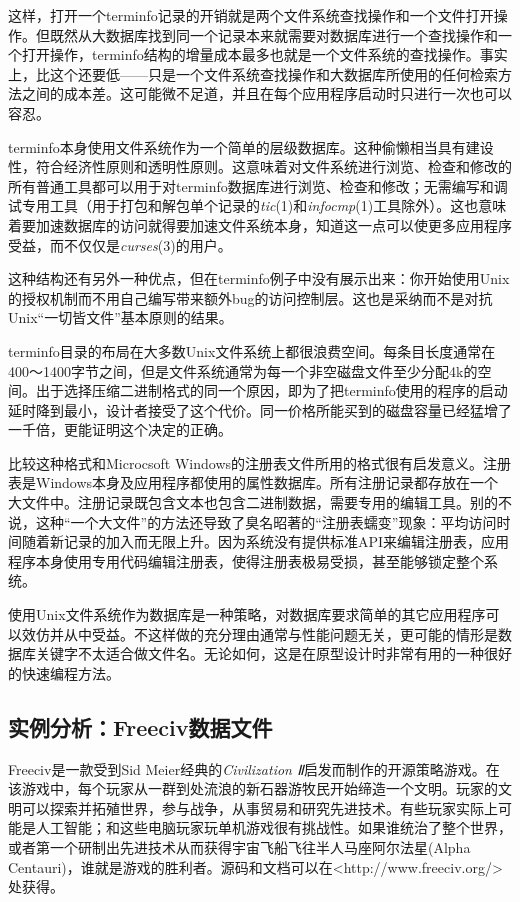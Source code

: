 \documentclass[12pt,oneside]{book}
\begin{document}
\begin{common-format}
这样，打开一个terminfo记录的开销就是两个文件系统查找操作和一个文件打开操作。但既然从大数据库找到同一个记录本来就需要对数据库进行一个查找操作和一个打开操作，terminfo结构的增量成本最多也就是一个文件系统的查找操作。事实上，比这个还要低——只是一个文件系统查找操作和大数据库所使用的任何检索方法之间的成本差。这可能微不足道，并且在每个应用程序启动时只进行一次也可以容忍。

terminfo本身使用文件系统作为一个简单的层级数据库。这种偷懒相当具有建设性，符合经济性原则和透明性原则。这意味着对文件系统进行浏览、检查和修改的所有普通工具都可以用于对terminfo数据库进行浏览、检查和修改；无需编写和调试专用工具（用于打包和解包单个记录的\textit{tic}(1)和\textit{infocmp}(1)工具除外）。这也意味着要加速数据库的访问就得要加速文件系统本身，知道这一点可以使更多应用程序受益，而不仅仅是\textit{curses}(3)的用户。

这种结构还有另外一种优点，但在terminfo例子中没有展示出来：你开始使用Unix的授权机制而不用自己编写带来额外bug的访问控制层。这也是采纳而不是对抗Unix“一切皆文件”基本原则的结果。

terminfo目录的布局在大多数Unix文件系统上都很浪费空间。每条目长度通常在400～1400字节之间，但是文件系统通常为每一个非空磁盘文件至少分配4k的空间。出于选择压缩二进制格式的同一个原因，即为了把terminfo使用的程序的启动延时降到最小，设计者接受了这个代价。同一价格所能买到的磁盘容量已经猛增了一千倍，更能证明这个决定的正确。

比较这种格式和Microcsoft Windows的注册表文件所用的格式很有启发意义。注册表是Windows本身及应用程序都使用的属性数据库。所有注册记录都存放在一个大文件中。注册记录既包含文本也包含二进制数据，需要专用的编辑工具。别的不说，这种“一个大文件”的方法还导致了臭名昭著的“注册表蠕变”现象：平均访问时间随着新记录的加入而无限上升。因为系统没有提供标准API来编辑注册表，应用程序本身使用专用代码编辑注册表，使得注册表极易受损，甚至能够锁定整个系统。

使用Unix文件系统作为数据库是一种策略，对数据库要求简单的其它应用程序可以效仿并从中受益。不这样做的充分理由通常与性能问题无关，更可能的情形是数据库关键字不太适合做文件名。无论如何，这是在原型设计时非常有用的一种很好的快速编程方法。


\subsection{实例分析：Freeciv数据文件}
Freeciv是一款受到Sid Meier经典的\textit{Civilization Ⅱ}启发而制作的开源策略游戏。在该游戏中，每个玩家从一群到处流浪的新石器游牧民开始缔造一个文明。玩家的文明可以探索并拓殖世界，参与战争，从事贸易和研究先进技术。有些玩家实际上可能是人工智能；和这些电脑玩家玩单机游戏很有挑战性。如果谁统治了整个世界，或者第一个研制出先进技术从而获得宇宙飞船飞往半人马座阿尔法星(Alpha Centauri)，谁就是游戏的胜利者。源码和文档可以在<http://www.freeciv.org/>处获得。


\end{common-format}
\end{document}
